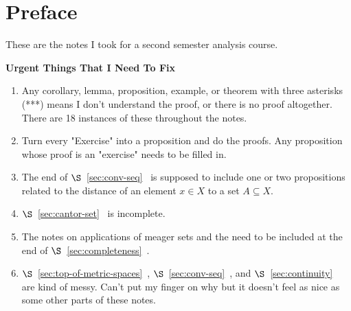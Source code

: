 \documentclass[11pt,twoside,openany]{memoir}
\begin{document}
    \tableofcontents

    \chapter*{Preface}
    These are the notes I took for a second semester analysis course. \nl
    
    \noindent \textbf{Urgent Things That I Need To Fix}
    \begin{enumerate}[label = (\arabic*),itemsep=1pt,topsep=3pt]
        \item Any corollary, lemma, proposition, example, or theorem with three asterisks (***) means I don't understand the proof, or there is no proof altogether. There are 18 instances of these throughout the notes.
        \item Turn every "Exercise" into a proposition and do the proofs. Any proposition whose proof is an "exercise" needs to be filled in.
        \item The end of $\S$~\ref{sec:conv-seq}~ is supposed to include one or two propositions related to the distance of an element $x \in X$ to a set $A \subseteq X$.
        \item $\S$~\ref{sec:cantor-set}~ is incomplete. 
        \item The notes on applications of meager sets and the  need to be included at the end of $\S$~\ref{sec:completeness}~.
        \item $\S$~\ref{sec:top-of-metric-spaces}~, $\S$~\ref{sec:conv-seq}~, and $\S$~\ref{sec:continuity}~ are kind of messy. Can't put my finger on why but it doesn't feel as nice as some other parts of these notes.
    \end{enumerate}
\end{document}
